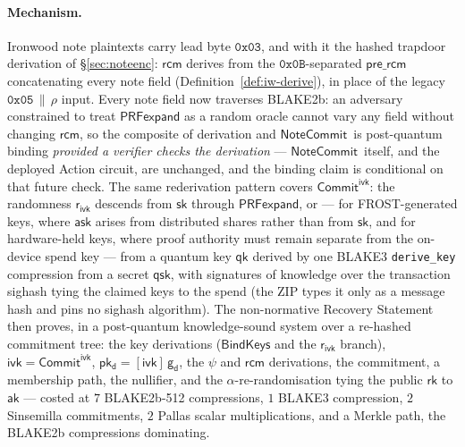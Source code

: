 \documentclass[11pt,a4paper]{article}
\theoremstyle{definition}
\newcommand{\rk}{\mathsf{rk}}
\newcommand{\NoteCommit}{\ensuremath{\mathsf{NoteCommit}}}
\newcommand{\CommitIvk}{\ensuremath{\mathsf{Commit}^{\mathsf{ivk}}}}
\newcommand{\ask}{\ensuremath{\mathsf{ask}}}
\newcommand{\aksym}{\ensuremath{\mathsf{ak}}}
\newcommand{\ivk}{\ensuremath{\mathsf{ivk}}}
\newcommand{\pkd}{\ensuremath{\mathsf{pk_d}}}
\newcommand{\gd}{\ensuremath{\mathsf{g_d}}}
\newcommand{\rcm}{\ensuremath{\mathsf{rcm}}}
\newcommand{\rivk}{\ensuremath{\mathsf{r_{ivk}}}}
\begin{document}
\paragraph{Mechanism.} Ironwood note plaintexts carry lead byte
$\mathtt{0x03}$, and with it the hashed trapdoor derivation of
\S\ref{sec:noteenc}: $\rcm$ derives from the $\mathtt{0x0B}$-separated
$\mathsf{pre\_rcm}$ concatenating every note field
(Definition~\ref{def:iw-derive}), in place of the legacy
$\mathtt{0x05} \,\|\, \rho$ input. Every note field now traverses
BLAKE2b: an adversary constrained to treat $\mathsf{PRFexpand}$ as a random
oracle cannot vary any field without changing $\rcm$, so the composite of
derivation and \NoteCommit\ is post-quantum binding \emph{provided a verifier
checks the derivation} --- \NoteCommit\ itself, and the deployed Action
circuit, are unchanged, and the binding claim is conditional on that future
check. The same rederivation pattern covers \CommitIvk: the randomness
$\rivk$ descends from $\mathsf{sk}$ through $\mathsf{PRFexpand}$, or --- for
FROST-generated keys, where $\ask$ arises from distributed shares rather than
from $\mathsf{sk}$, and for hardware-held keys, where proof authority must
remain separate from the on-device spend key --- from a quantum key
$\mathsf{qk}$ derived by one BLAKE3
\texttt{derive\_key} compression from a secret $\mathsf{qsk}$, with signatures
of knowledge over the transaction sighash tying the claimed keys to the spend
(the ZIP types it only as a message hash and pins no sighash algorithm). The
non-normative Recovery Statement then proves, in a post-quantum
knowledge-sound system over a re-hashed commitment tree: the key derivations
($\mathsf{BindKeys}$ and the $\rivk$ branch), $\ivk = \CommitIvk$,
$\pkd = [\ivk]\,\gd$, the $\psi$ and $\rcm$ derivations, the commitment, a
membership path, the nullifier, and the $\alpha$-re-randomisation tying the
public $\rk$ to $\aksym$ --- costed at $7$ BLAKE2b-512 compressions,
$1$ BLAKE3 compression, $2$ Sinsemilla commitments, $2$ Pallas scalar
multiplications, and a Merkle path, the BLAKE2b compressions dominating.
\end{document}

